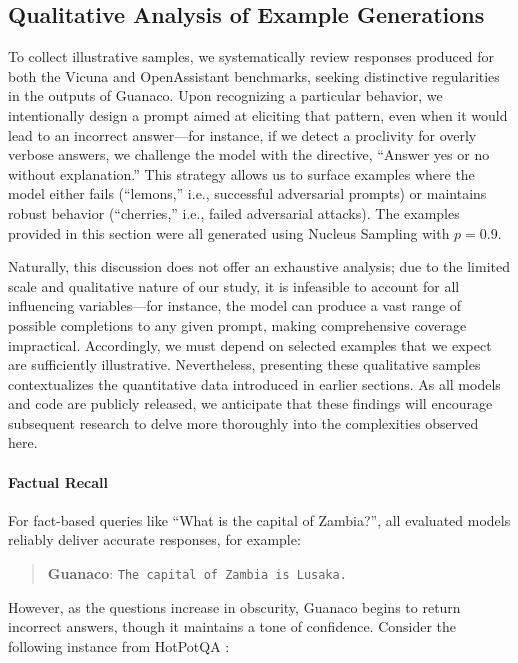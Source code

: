 \subsection{Qualitative Analysis of Example Generations}
\label{ssec:examples}

To collect illustrative samples, we systematically review responses produced for both the Vicuna and OpenAssistant benchmarks, seeking distinctive regularities in the outputs of {Guanaco}. Upon recognizing a particular behavior, we intentionally design a prompt aimed at eliciting that pattern, even when it would lead to an incorrect answer—for instance, if we detect a proclivity for overly verbose answers, we challenge the model with the directive, ``Answer yes or no without explanation.'' This strategy allows us to surface examples where the model either fails (``lemons,'' i.e., successful adversarial prompts) or maintains robust behavior (``cherries,'' i.e., failed adversarial attacks). The examples provided in this section were all generated using Nucleus Sampling \cite{holtzmancurious} with $p=0.9$.

Naturally, this discussion does not offer an exhaustive analysis; due to the limited scale and qualitative nature of our study, it is infeasible to account for all influencing variables—for instance, the model can produce a vast range of possible completions to any given prompt, making comprehensive coverage impractical. Accordingly, we must depend on selected examples that we expect are sufficiently illustrative. Nevertheless, presenting these qualitative samples contextualizes the quantitative data introduced in earlier sections. As all models and code are publicly released, we anticipate that these findings will encourage subsequent research to delve more thoroughly into the complexities observed here.

\paragraph{Factual Recall} For fact-based queries like ``What is the capital of Zambia?'', all evaluated models reliably deliver accurate responses, for example:

\begin{quote} 
    \textbf{Guanaco}:
    \texttt{The capital of Zambia is Lusaka.}
\end{quote}

 However, as the questions increase in obscurity, {Guanaco} begins to return incorrect answers, though it maintains a tone of confidence. Consider the following instance from HotPotQA \citep{yang2018hotpotqa}:

